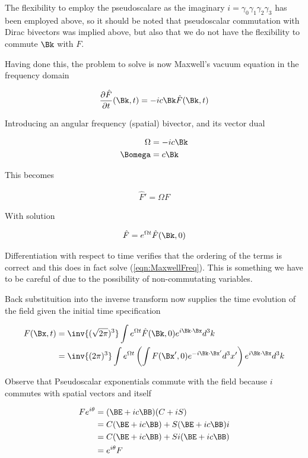 The flexibility to employ the pseudoscalare as the imaginary $i = \gamma_0 \gamma_1 \gamma_2 \gamma_3$ has been employed above, so it should
be noted that pseudoscalar commutation with Dirac bivectors was implied above, but also that we do not have the flexibility to commute $\Bk$ with $F$.

Having done this, the problem to solve is now Maxwell's vacuum equation in the frequency domain

\begin{align*}
\PD{t}{\hat{F}}(\Bk,t) = -i c \Bk \hat{F}(\Bk,t)
\end{align*}

Introducing an angular frequency (spatial) bivector, and its vector dual

\begin{align}
\Omega &= -i c \Bk \\
\Bomega &= c \Bk
\end{align}

This becomes

\begin{align}\label{eqn:MaxwellFreq}
\hat{F}' = \Omega F
\end{align}

With solution

\begin{align}
\hat{F} = e^{\Omega t} \hat{F}(\Bk,0)
\end{align}

Differentiation with respect to time verifies that the ordering of the terms is correct and this does in fact solve (\ref{eqn:MaxwellFreq}).  This
is something we have to be careful of due to the possibility of non-commutating variables.

Back substituition into the inverse transform now supplies the time evolution of the field given the initial time specification

\begin{align*}
F(\Bx,t)
&= \inv{(\sqrt{2\pi})^3} \int e^{\Omega t} \hat{F}(\Bk,0) e^{i \Bk \cdot \Bx} d^3 k \\
&= \inv{(2\pi)^3} \int e^{\Omega t} \left( \int {F}(\Bx',0) e^{-i \Bk \cdot \Bx'} d^3 x' \right) e^{i \Bk \cdot \Bx} d^3 k
\end{align*}

Observe that Pseudoscalar exponentials commute with the field because $i$ commutes with spatial vectors and itself

\begin{align*}
F e^{i\theta}
&= (\BE + i c \BB) (C + iS) \\
&=
C (\BE + i c \BB)
+ S (\BE + i c \BB) i  \\
&=
C (\BE + i c \BB)
+ S i (\BE + i c \BB) \\
&=
e^{i\theta} F
\end{align*}

